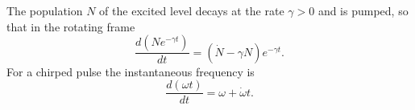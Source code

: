 \documentclass{article}
\begin{document}
The population $N$ of the excited level decays at the rate $\gamma > 0$ and is pumped, so that
in the rotating frame
\begin{equation}
\frac{d\left(N e^{-\gamma t}\right)}{dt} = \left(\dot N - \gamma N\right) e^{-\gamma t} .
\label{eq:dot1}
\end{equation}
For a chirped pulse the instantaneous frequency is
\begin{equation}
\frac{d(\omega t)}{dt} = \omega + \dot\omega t .
\label{eq:dot2}
\end{equation}
\end{document}
